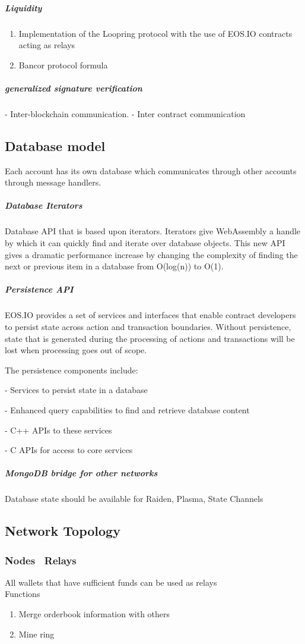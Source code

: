 \documentclass[]{article}
\begin{document}
	\subparagraph{Liquidity}
	\begin{enumerate} 
	\item Implementation of the Loopring protocol with the use of EOS.IO 
	contracts acting as relays
	\item Bancor protocol formula
	\end{enumerate}
	
	\subparagraph{generalized signature verification}
	- Inter-blockchain communication.
	- Inter contract communication
	
	
	\subsection{Database model}
	 Each account has its own database which communicates through other accounts through message handlers.
	 
	
	\subparagraph{Database Iterators}
	Database API that is based upon iterators. Iterators give WebAssembly a handle by which it can quickly find and iterate over database objects. This new API gives a dramatic performance increase by changing the complexity of finding the next or previous item in a database from O(log(n)) to O(1).

	\subparagraph{Persistence API}
	
	EOS.IO provides a set of services and interfaces that enable 
	contract developers to persist state across action and transaction 
	boundaries. Without persistence, state that is generated during 
	the processing of actions and transactions will be lost when 
	processing goes out of scope. 
	
	The persistence components include:
	
	- Services to persist state in a database
	
	- Enhanced query capabilities to 
	  find and retrieve database content
	
	- C++ APIs to these services
	
	- C APIs for access to core services

	\subparagraph{MongoDB bridge for other networks}
	Database state should be available for Raiden, Plasma, State Channels

	\subsection{Network Topology}
	\subsubsection{Nodes \ Relays}
	All wallets that have sufficient funds can be used as relays\\
	Functions 
	\begin{enumerate}
		\item Merge orderbook information with others
		\item Mine ring 
	\end{enumerate}
	
\end{document}
